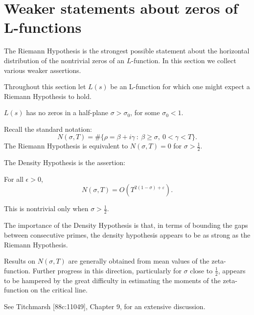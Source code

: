 \documentclass[12pt,letterpaper, reqno]{aimpl}
\begin{document}
\section{Weaker statements about zeros of L-functions}
The Riemann Hypothesis is the strongest possible statement
about the horizontal distribution of the nontrivial zeros
of an $L$-function.  In this section we collect various
weaker assertions. 

Throughout this section let $L(s)$ be an L-function
for which one might expect a Riemann Hypothesis to hold.

\begin{problemblock} 

\begin{problem}[2.1]
 $L(s)$
has no zeros in a half-plane
$\sigma > \sigma_0$, for some $\sigma_0 <1 $.
\end{problem}

\end{problemblock}


 \begin{problemblock}

Recall the standard notation:
$$
N(\sigma,T) = \#\{\rho=\beta+i\gamma\ :\ \beta \ge \sigma,\ 0<\gamma<T\}.
$$
The Riemann Hypothesis is equivalent to $N(\sigma,T)=0$ for $\sigma>\frac12$.

The Density Hypothesis is the assertion:

\begin{problem}[2.2] For all $\epsilon>0$,
$$
N(\sigma,T) = O(T^{2(1-\sigma)+\varepsilon}) .
$$

\end{problem}

This is nontrivial 
only when $\sigma > \frac12$.

\begin{remark}
The importance of the Density Hypothesis is that, in terms of 
bounding the gaps between consecutive primes, the density hypothesis
appears to be as strong as the Riemann Hypothesis.
\end{remark}

\begin{remark}
Results on $N(\sigma,T)$ are generally obtained from mean
values of the zeta-function.  Further progress in this
direction, particularly for $\sigma$ close to $\frac12$, appears
to be hampered  by the great difficulty in estimating the
moments of the zeta-function on the critical line.

See Titchmarsh [88c:11049], Chapter 9, for an extensive discussion.

\end{remark}

\end{problemblock}
\end{document}
